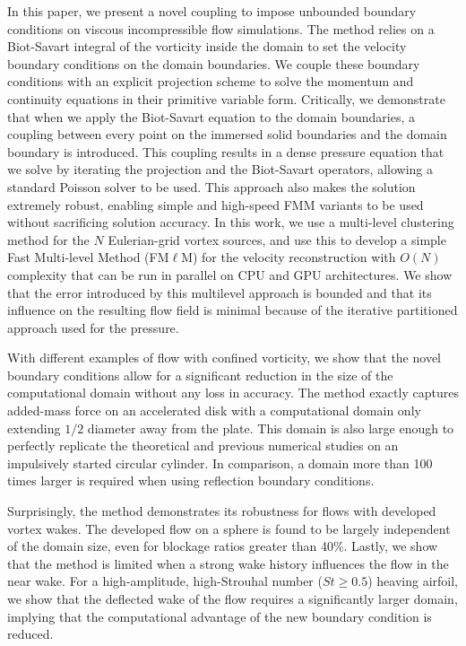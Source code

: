 \documentclass[11pt]{article}
\begin{document}
In this paper, we present a novel coupling to impose unbounded boundary conditions on viscous incompressible flow simulations. The method relies on a Biot-Savart integral of the vorticity inside the domain to set the velocity boundary conditions on the domain boundaries. We couple these boundary conditions with an explicit projection scheme to solve the momentum and continuity equations in their primitive variable form. Critically, we demonstrate that when we apply the Biot-Savart equation to the domain boundaries, a coupling between every point on the immersed solid boundaries and the domain boundary is introduced. This coupling results in a dense pressure equation that we solve by iterating the projection and the Biot-Savart operators, allowing a standard Poisson solver to be used. This approach also makes the solution extremely robust, enabling simple and high-speed FMM variants to be used without sacrificing solution accuracy. In this work, we use a multi-level clustering method for the $N$ Eulerian-grid vortex sources, and use this to develop a simple Fast Multi-level Method (FM$\ell$M) for the velocity reconstruction with $O(N)$ complexity that can be run in parallel on CPU and GPU architectures. We show that the error introduced by this multilevel approach is bounded and that its influence on the resulting flow field is minimal because of the iterative partitioned approach used for the pressure.

With different examples of flow with confined vorticity, we show that the novel boundary conditions allow for a significant reduction in the size of the computational domain without any loss in accuracy. The method exactly captures added-mass force on an accelerated disk with a computational domain only extending $1/2$ diameter away from the plate. This domain is also large enough to perfectly replicate the theoretical and previous numerical studies on an impulsively started circular cylinder. In comparison, a domain more than 100 times larger is required when using reflection boundary conditions.

Surprisingly, the method demonstrates its robustness for flows with developed vortex wakes. The developed flow on a sphere is found to be largely independent of the domain size, even for blockage ratios greater than 40\%. 
Lastly, we show that the method is limited when a strong wake history influences the flow in the near wake. For a high-amplitude, high-Strouhal number ($St\ge0.5$) heaving airfoil, we show that the deflected wake of the flow requires a significantly larger domain, implying that the computational advantage of the new boundary condition is reduced.
\end{document}
